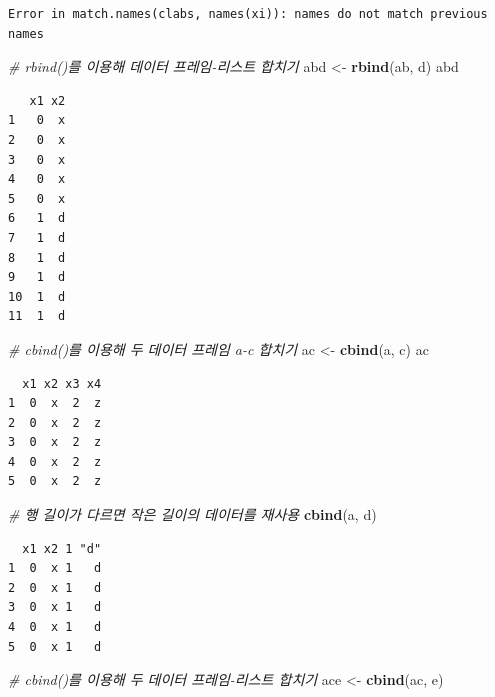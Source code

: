 \documentclass[
  11pt,
]{krantz}
\newenvironment{Shaded}{\begin{snugshade}}{\end{snugshade}}
\newcommand{\CommentTok}[1]{\textcolor[rgb]{0.37,0.37,0.37}{\textit{#1}}}
\newcommand{\KeywordTok}[1]{\textcolor[rgb]{0.27,0.27,0.27}{\textbf{#1}}}
\newcommand{\NormalTok}[1]{#1}
\newcommand{\StringTok}[1]{\textcolor[rgb]{0.5,0.5,0.5}{#1}}
\begin{document}
\begin{verbatim}
Error in match.names(clabs, names(xi)): names do not match previous names
\end{verbatim}

\begin{Shaded}
\begin{Highlighting}[]
\CommentTok{# rbind()를 이용해 데이터 프레임-리스트 합치기}
\NormalTok{abd <-}\StringTok{ }\KeywordTok{rbind}\NormalTok{(ab, d)}
\NormalTok{abd}
\end{Highlighting}
\end{Shaded}

\begin{verbatim}
   x1 x2
1   0  x
2   0  x
3   0  x
4   0  x
5   0  x
6   1  d
7   1  d
8   1  d
9   1  d
10  1  d
11  1  d
\end{verbatim}

\begin{Shaded}
\begin{Highlighting}[]
\CommentTok{# cbind()를 이용해 두 데이터 프레임 a-c 합치기}
\NormalTok{ac <-}\StringTok{ }\KeywordTok{cbind}\NormalTok{(a, c)}
\NormalTok{ac}
\end{Highlighting}
\end{Shaded}

\begin{verbatim}
  x1 x2 x3 x4
1  0  x  2  z
2  0  x  2  z
3  0  x  2  z
4  0  x  2  z
5  0  x  2  z
\end{verbatim}

\begin{Shaded}
\begin{Highlighting}[]
\CommentTok{# 행 길이가 다르면 작은 길이의 데이터를 재사용}
\KeywordTok{cbind}\NormalTok{(a, d)}
\end{Highlighting}
\end{Shaded}

\begin{verbatim}
  x1 x2 1 "d"
1  0  x 1   d
2  0  x 1   d
3  0  x 1   d
4  0  x 1   d
5  0  x 1   d
\end{verbatim}

\begin{Shaded}
\begin{Highlighting}[]
\CommentTok{# cbind()를 이용해 두 데이터 프레임-리스트 합치기}
\NormalTok{ace <-}\StringTok{ }\KeywordTok{cbind}\NormalTok{(ac, e)}
\end{Highlighting}
\end{Shaded}

\normalsize
\end{document}
